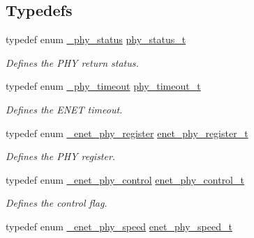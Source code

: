 \subsection*{Typedefs}
\begin{DoxyCompactItemize}
\item 
typedef enum \hyperlink{group__phy__driver_ga28619b08d6526aa3af9ea59c0db08d4b}{\+\_\+phy\+\_\+status} \hyperlink{group__phy__driver_gaa62a41ce1e26145301eaf130ee4da5f7}{phy\+\_\+status\+\_\+t}\hypertarget{group__phy__driver_gaa62a41ce1e26145301eaf130ee4da5f7}{}\label{group__phy__driver_gaa62a41ce1e26145301eaf130ee4da5f7}

\begin{DoxyCompactList}\small\item\em Defines the P\+HY return status. \end{DoxyCompactList}\item 
typedef enum \hyperlink{group__phy__driver_ga0a607514e221403ba1d43a898e6de111}{\+\_\+phy\+\_\+timeout} \hyperlink{group__phy__driver_gad1b3bd40fec9690070f8028525c9792a}{phy\+\_\+timeout\+\_\+t}\hypertarget{group__phy__driver_gad1b3bd40fec9690070f8028525c9792a}{}\label{group__phy__driver_gad1b3bd40fec9690070f8028525c9792a}

\begin{DoxyCompactList}\small\item\em Defines the E\+N\+ET timeout. \end{DoxyCompactList}\item 
typedef enum \hyperlink{group__phy__driver_gab2743b422515f6d141e5386380832475}{\+\_\+enet\+\_\+phy\+\_\+register} \hyperlink{group__phy__driver_ga57565a311c189d65ddc985d1845e3917}{enet\+\_\+phy\+\_\+register\+\_\+t}\hypertarget{group__phy__driver_ga57565a311c189d65ddc985d1845e3917}{}\label{group__phy__driver_ga57565a311c189d65ddc985d1845e3917}

\begin{DoxyCompactList}\small\item\em Defines the P\+HY register. \end{DoxyCompactList}\item 
typedef enum \hyperlink{group__phy__driver_ga6a73ce8fecc8d411b87534a1c598f45b}{\+\_\+enet\+\_\+phy\+\_\+control} \hyperlink{group__phy__driver_gace87387943dc1795fcb70bcb8c37e510}{enet\+\_\+phy\+\_\+control\+\_\+t}\hypertarget{group__phy__driver_gace87387943dc1795fcb70bcb8c37e510}{}\label{group__phy__driver_gace87387943dc1795fcb70bcb8c37e510}

\begin{DoxyCompactList}\small\item\em Defines the control flag. \end{DoxyCompactList}\item 
typedef enum \hyperlink{group__phy__driver_ga123897a64fd9524efbc2d786c8a8a503}{\+\_\+enet\+\_\+phy\+\_\+speed} \hyperlink{group__phy__driver_ga6525c0ff103f370287f9995e8761b325}{enet\+\_\+phy\+\_\+speed\+\_\+t}\hypertarget{group__phy__driver_ga6525c0ff103f370287f9995e8761b325}{}\label{group__phy__driver_ga6525c0ff103f370287f9995e8761b325}


\end{DoxyCompactItemize}
